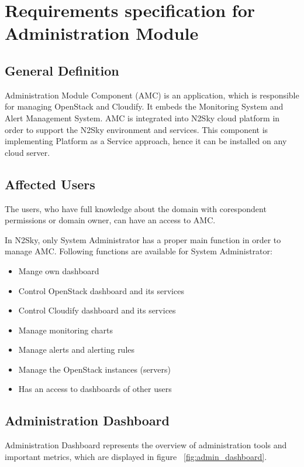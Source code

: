 \section{Requirements specification for Administration Module}\label{Administration components}

\subsection{General Definition}\label{General Definition AMC}

Administration Module Component (AMC) is an application, which is responsible for managing OpenStack and Cloudify. It embeds the Monitoring System and Alert Management System. AMC is integrated into N2Sky cloud platform in order to support the N2Sky environment and services. This component is implementing Platform as a Service approach, hence it can be installed on any cloud server. 

\subsection{Affected Users}\label{Affected users}

The users, who have full knowledge about the domain with corespondent permissions or domain owner, can have an access to AMC.

In N2Sky, only System Administrator has a proper main function in order to manage AMC.
Following functions are available for System Administrator:
\begin{itemize}
\item Mange own dashboard
\item Control OpenStack dashboard and its services
\item Control Cloudify dashboard and its services
\item Manage monitoring charts
\item Manage alerts and alerting rules
\item Manage the OpenStack instances (servers)
\item Has an access to dashboards of other users
\end{itemize}



\subsection{Administration Dashboard}\label{Administration Dashboard}

Administration Dashboard represents the overview of administration tools and important metrics, which are displayed in figure ~\ref{fig:admin_dashboard}. 

